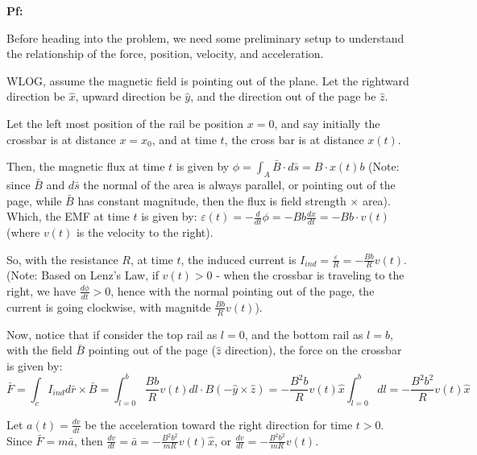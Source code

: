 \documentclass{article}
\begin{document}
\textbf{Pf:}

Before heading into the problem, we need some preliminary setup to understand the relationship of the force, position, velocity, and acceleration.

\hfill

WLOG, assume the magnetic field is pointing out of the plane. Let the rightward direction be $\hat{x}$, upward direction be $\hat{y}$, and the direction out of the page be $\hat{z}$.

Let the left most position of the rail be position $x=0$, and say initially the crossbar is at distance $x=x_0$, and at time $t$, 
the cross bar is at distance $x(t)$.

Then, the magnetic flux at time $t$ is given by $\phi=\int_A\bar{B}\cdot d\bar{s} = B\cdot x(t)b$ 
(Note: since $\bar{B}$ and $d\bar{s}$ the normal of the area is always parallel, or pointing out of the page, while $\bar{B}$ has constant magnitude,
then the flux is field strength $\times$ area).
Which, the EMF at time $t$ is given by: $\varepsilon(t)=-\frac{d}{dt}\phi = -Bb\frac{dx}{dt} = -Bb\cdot v(t)$ (where $v(t)$ is the velocity to the right).

So, with the resistance $R$, at time $t$, the induced current is $I_{ind}=\frac{\varepsilon}{R} = -\frac{Bb}{R}v(t)$.
(Note: Based on Lenz's Law, if $v(t)>0$ - when the crossbar is traveling to the right, we have $\frac{d\phi}{dt}>0$, hence with the normal pointing out of the page,
the current is going clockwise, with magnitde $\frac{Bb}{R}v(t)$).

\hfill

Now, notice that if consider the top rail as $l=0$, and the bottom rail as $l=b$, with the field $\bar{B}$ pointing out of the page ($\hat{z}$ direction), the force on the crossbar is given by:
$$\bar{F}=\int_c I_{ind}d\bar{r}\times \bar{B} = \int_{l=0}^{b}\frac{Bb}{R}v(t)dl \cdot B (-\hat{y}\times \hat{z}) = -\frac{B^2b}{R}v(t)\hat{x}\int_{l=0}^{b}dl = -\frac{B^2b^2}{R}v(t)\hat{x}$$

Let $a(t)=\frac{dv}{dt}$ be the acceleration toward the right direction for time $t>0$. Since $\bar{F}=m\bar{a}$, then $\frac{dv}{dt}=\bar{a}=-\frac{B^2b^2}{mR}v(t)\hat{x}$, or $\frac{dv}{dt}=-\frac{B^2b^2}{mR}v(t)$.

\hfill
\end{document}
